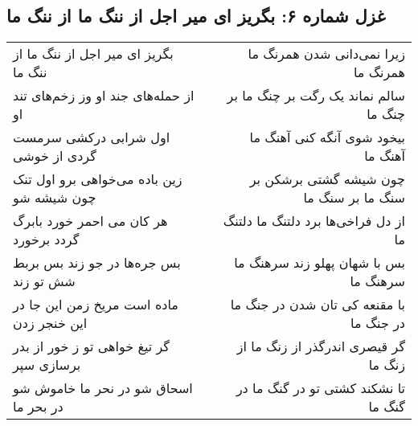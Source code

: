 \begin{center}
\section*{غزل شماره ۶: بگریز ای میر اجل از ننگ ما از ننگ ما}
\label{sec:0006}
\begin{longtable}{l p{0.5cm} r}
بگریز ای میر اجل از ننگ ما از ننگ ما
&&
زیرا نمی‌دانی شدن همرنگ ما همرنگ ما
\\
از حمله‌های جند او وز زخم‌های تند او
&&
سالم نماند یک رگت بر چنگ ما بر چنگ ما
\\
اول شرابی درکشی سرمست گردی از خوشی
&&
بیخود شوی آنگه کنی آهنگ ما آهنگ ما
\\
زین باده می‌خواهی برو اول تنک چون شیشه شو
&&
چون شیشه گشتی برشکن بر سنگ ما بر سنگ ما
\\
هر کان می احمر خورد بابرگ گردد برخورد
&&
از دل فراخی‌ها برد دلتنگ ما دلتنگ ما
\\
بس جره‌ها در جو زند بس بربط شش تو زند
&&
بس با شهان پهلو زند سرهنگ ما سرهنگ ما
\\
ماده است مریخ زمن این جا در این خنجر زدن
&&
با مقنعه کی تان شدن در جنگ ما در جنگ ما
\\
گر تیغ خواهی تو ز خور از بدر برسازی سپر
&&
گر قیصری اندرگذر از زنگ ما از زنگ ما
\\
اسحاق شو در نحر ما خاموش شو در بحر ما
&&
تا نشکند کشتی تو در گنگ ما در گنگ ما
\\
\end{longtable}
\end{center}
